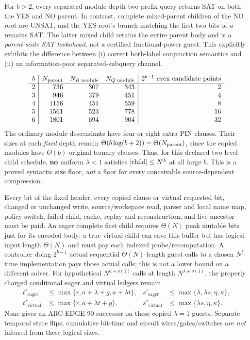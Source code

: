 \documentclass[11pt]{article}
\begin{document}
For $b>2$, every separated-module depth-two prefix query returns SAT
on both the YES and NO parent. In contrast, complete mixed-parent
children of the NO root are UNSAT, and the YES root's branch matching
the first two bits of $u$ remains SAT. The latter mixed child retains
the entire parent body and is a \emph{parent-scale SAT lookahead}, not a
certified fractional-power guest. This explicitly exhibits the
difference between (i) correct both-label conjunction semantics and
(ii) an information-poor separated-subquery channel.

\[
\begin{array}{c|rrr|r}
 b& N_{\rm parent}&N_{R\text{ module}}&N_{Q\text{ module}}&
 2^{b-1}\ \text{even candidate points}\\\hline
 2&736&307&343&2\\
 3&946&379&451&4\\
 4&1156&451&559&8\\
 5&1561&523&778&16\\
 6&1801&694&904&32
\end{array}
\]
The ordinary module descendants have four or eight extra PIN clauses.
Their sizes at each \emph{fixed} depth remain
$\Theta(b\log(b+2))=\Theta(N_{\rm parent})$, since the copied modules
have $\Theta(b)$ original ternary clauses. Thus, for this declared
two-level child schedule, \textbf{no} uniform $\lambda<1$ satisfies
$|{\rm child}|\le N^\lambda$ at all large $b$. This is a proved
syntactic size floor, \emph{not} a floor for every conceivable
source-dependent compression.

Every bit of the fixed header, every copied clause or virtual
requested bit, changed or unchanged write, source/workspace read,
parser and local name map, policy switch, failed child, cache,
replay and reconstruction, and live ancestor must be paid.
An eager complete first child requires $\Theta(N)$ peak mutable bits
just for its encoded body; a true virtual child can save this buffer
but has logical input length $\Theta(N)$ and must pay each indexed
probe/recomputation. A controller doing $2^{b-1}$ actual
sequential $\Theta(N)$-length guest calls to a chosen $N^t$-time
implementation pays those actual calls; this is not a
lower bound on a different solver. For hypothetical
$N^{a+o(1)}$ calls at length $N^{\lambda+o(1)}$,
the properly charged conditional eager and virtual ledgers remain
\[
 \begin{aligned}
 t'_{\mathrm{eager}}&\le
 \max\{r,a+\lambda+g,a+\lambda t\},&
 s'_{\mathrm{eager}}&\le\max\{\lambda,\lambda s,\eta,\kappa\},\\
 t'_{\mathrm{virtual}}&\le
 \max\{r,a+\lambda t+g\},&
 s'_{\mathrm{virtual}}&\le\max\{\lambda s,\eta,\kappa\}.
 \end{aligned}
 \tag{6}
\]
None gives an ARC-EDGE-90 successor on these copied $\lambda=1$
guests. Separate temporal state flips, cumulative bit-time and
circuit wires/gates/switches are \emph{not} inferred from these
logical sizes.
\end{document}
